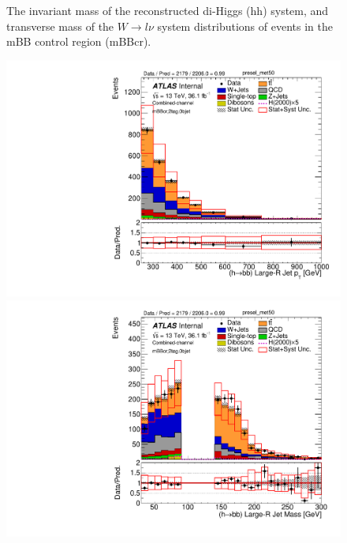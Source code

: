 \begin{figure}[!h]
\begin{center}
\caption{The invariant mass of the reconstructed di-Higgs (hh) system, \met and transverse mass of the $W \to l\nu$ system
distributions of events in the mBB control region (mBBcr).}
\label{fig:boosted_mbbcr_mainplots}
\end{center}
\end{figure}
% 
\begin{figure}[!h]
\begin{center}
\includegraphics[scale=0.33]{./figures/boosted/PlotsInMbbCR/DataMC_2tag_0bjet_mbbcr_lepton_presel_met50_HbbPt}
\includegraphics[scale=0.33]{./figures/boosted/PlotsInMbbCR/DataMC_2tag_0bjet_mbbcr_lepton_presel_met50_HbbMass} \\
\par\medskip

\end{center}
\end{figure}
